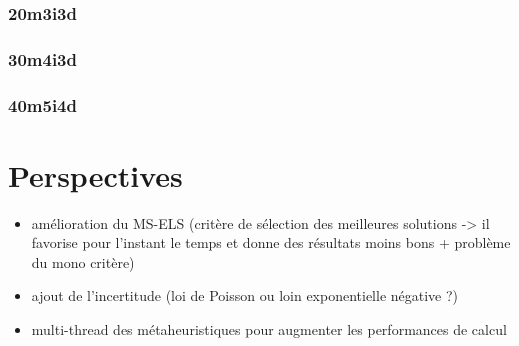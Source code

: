                 
            \subsubsection{20m3i3d}
                
                
                
            \subsubsection{30m4i3d}
                
                
                
            \subsubsection{40m5i4d}
                
                
                


    \section{Perspectives}
    
    	\begin{itemize}
    		\item amélioration du MS-ELS (critère de sélection des meilleures solutions -> il favorise pour l'instant le temps et donne des résultats moins bons + problème du mono critère)
    		\item ajout de l'incertitude (loi de Poisson ou loin exponentielle négative ?)
    		\item multi-thread des métaheuristiques pour augmenter les performances de calcul
    	\end{itemize}
    		
